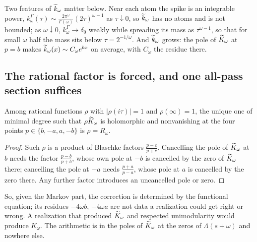 Two features of $\widetilde k_\omega$ matter below. Near each atom the spike is an
integrable power, $k^\Gamma_\omega(\tau)\sim\frac{2\pi^\omega}{\Gamma(\omega)}(2\tau)^{\omega-1}$
as $\tau\downarrow0$, so $\widetilde k_\omega$ has no atoms and is not bounded; as
$\omega\downarrow0$, $k^\Gamma_\omega\to\delta_0$ weakly while spreading its
mass as $\tau^{\omega-1}$, so that for small $\omega$ half the mass sits below
$\tau=2^{-1/\omega}$. And $\widetilde k_\omega$ grows: the pole of $\widetilde K_\omega$ at
$p=b$ makes $\widetilde k_\omega(x)\sim C_\omega e^{bx}$ on average, with $C_\omega$ the
residue there.

\subsection{The rational factor is forced, and one all-pass section suffices}

\begin{proposition}[Forcedness]\label{prop:forced}
Among rational functions $\rho$ with $|\rho(i\tau)|=1$ and $\rho(\infty)=1$,
the unique one of minimal degree such that $\rho\widetilde K_\omega$ is holomorphic and
nonvanishing at the four points $p\in\{b,-a,a,-b\}$ is $\rho=R_\omega$.
\end{proposition}
\begin{proof}
Such $\rho$ is a product of Blaschke factors $\frac{p-c}{p+\bar c}$. Cancelling
the pole of $\widetilde K_\omega$ at $b$ needs the factor $\frac{p-b}{p+b}$, whose own
pole at $-b$ is cancelled by the zero of $\widetilde K_\omega$ there; cancelling the pole
at $-a$ needs $\frac{p+a}{p-a}$, whose pole at $a$ is cancelled by the zero
there. Any further factor introduces an uncancelled pole or zero.
\end{proof}

So, given the Markov part, the correction is determined by the functional
equation; its residues $-4\omega b$, $-4\omega a$ are not data a realization
could get right or wrong. A realization that produced $\widetilde K_\omega$ and respected
unimodularity would produce $K_\omega$. The arithmetic is in the poles of
$\widetilde K_\omega$ at the zeros of $\Lambda(s+\omega)$ and nowhere else.

